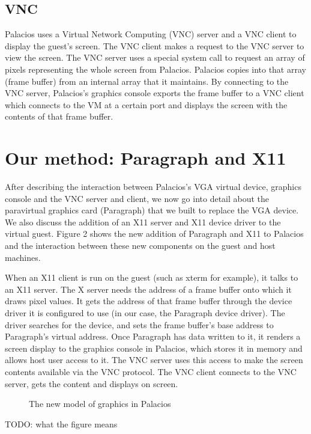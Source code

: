 \documentclass{acm_proc_article-sp}
\begin{document}
\subsection{VNC}
Palacios uses a Virtual Network Computing (VNC) server and a VNC client to
display the guest's screen. The VNC client makes a request to the VNC server to view the screen. 
The VNC server uses a special system call to request an array of pixels representing the whole screen from Palacios. 
Palacios copies into that array (frame buffer) from an internal array that it
maintains. By connecting to the VNC server, Palacios's graphics console exports
the frame buffer to a VNC client which connects to the VM at a certain port and
displays the screen with the contents of that frame buffer.

\section{Our method: Paragraph and X11}
After describing the interaction between Palacios's VGA virtual device, graphics console and the VNC server and client, we now go into detail
about the paravirtual graphics card (Paragraph) that we built to replace the VGA 
device. We also discuss the addition of an X11 server and X11 device driver to
the virtual guest. Figure 2 shows the new addition of Paragraph and X11 to
Palacios and the interaction between these new components on the guest and host
machines. 
\par
When an X11 client is run on the guest (such as xterm for example), it talks to
an X11 server. The X server needs the address of a frame buffer onto which it
draws pixel values. It gets the address of that frame buffer through the device
driver it is configured to use (in our case, the Paragraph device driver). The 
driver searches for the device, and sets the frame buffer's base address to
Paragraph's virtual address. Once Paragraph has data written to it, it renders a
screen display to the graphics console in Palacios, which stores it in memory
and allows host user access to it. The VNC server uses this access to make the 
screen contents available via the VNC protocol. The VNC client connects to the 
VNC server, gets the content and displays on screen.
\begin{figure}[h]                                              
\centering                                                     
{}                   
\caption{The new model of graphics in Palacios}   
\end{figure}                                                   
 TODO: what the figure means
\end{document}
